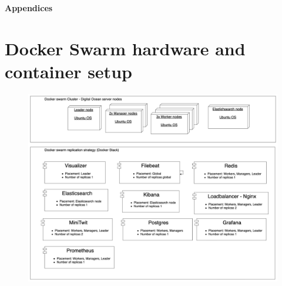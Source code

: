 \newcommand{\appendixhead}%
{\centering\textbf{\huge Appendices}
\vspace{0.25in}}

\appendixhead
\appendix

\section{Docker Swarm hardware and container setup} \label{swarm}

\begin{figure}[H]
    \centering
    \captionsetup{justification=centering,margin=1cm}
    \includegraphics[width=\linewidth]{report/images/DockerSwarm.png}
\end{figure}